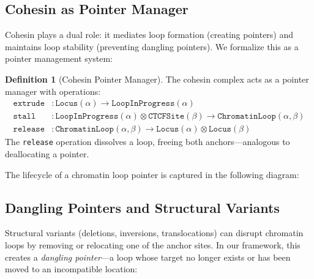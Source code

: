 \documentclass[12pt,a4paper]{article}
\theoremstyle{plain}
\theoremstyle{definition}
\newtheorem{definition}[theorem]{Definition}
\begin{document}
\subsection{Cohesin as Pointer Manager}

Cohesin plays a dual role: it mediates loop formation (creating pointers) and maintains loop stability (preventing dangling pointers). We formalize this as a pointer management system:

\begin{definition}[Cohesin Pointer Manager]\label{def:cohesin-manager}
The cohesin complex acts as a pointer manager with operations:
\begin{align*}
  \texttt{extrude} &: \texttt{Locus}(\alpha) \to \texttt{LoopInProgress}(\alpha) \\
  \texttt{stall} &: \texttt{LoopInProgress}(\alpha) \otimes \texttt{CTCFSite}(\beta) \to \texttt{ChromatinLoop}(\alpha, \beta) \\
  \texttt{release} &: \texttt{ChromatinLoop}(\alpha, \beta) \to \texttt{Locus}(\alpha) \otimes \texttt{Locus}(\beta)
\end{align*}
The \texttt{release} operation dissolves a loop, freeing both anchors---analogous to deallocating a pointer.
\end{definition}

The lifecycle of a chromatin loop pointer is captured in the following diagram:

\begin{center}
\end{center}

\subsection{Dangling Pointers and Structural Variants}

Structural variants (deletions, inversions, translocations) can disrupt chromatin loops by removing or relocating one of the anchor sites. In our framework, this creates a \emph{dangling pointer}---a loop whose target no longer exists or has been moved to an incompatible location:
\end{document}

